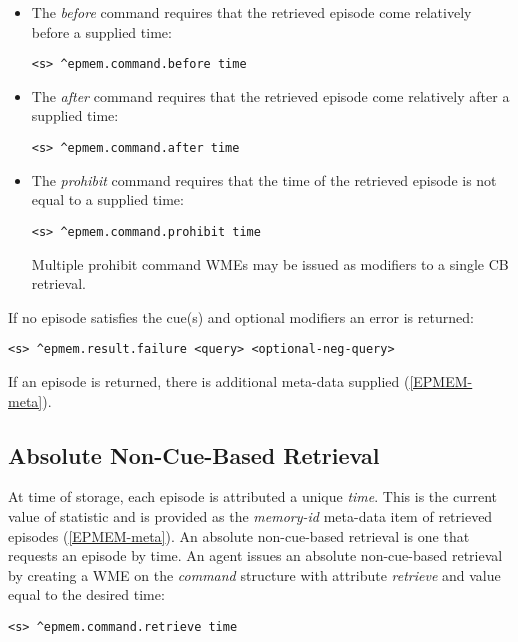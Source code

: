 \begin{itemize}

\item 
The \emph{before} command requires that the retrieved episode come relatively before a supplied time:
\begin{verbatim}
<s> ^epmem.command.before time
\end{verbatim}

\item 
The \emph{after} command requires that the retrieved episode come relatively after a supplied time:
\begin{verbatim}
<s> ^epmem.command.after time
\end{verbatim}

\item 
The \emph{prohibit} command requires that the time of the retrieved episode is not equal to a supplied time:
\begin{verbatim}
<s> ^epmem.command.prohibit time
\end{verbatim}
Multiple prohibit command WMEs may be issued as modifiers to a single CB retrieval.

\end{itemize}

If no episode satisfies the cue(s) and optional modifiers an error is returned:

\begin{verbatim}
<s> ^epmem.result.failure <query> <optional-neg-query>
\end{verbatim}

If an episode is returned, there is additional meta-data supplied (\ref{EPMEM-meta}).

\subsection{Absolute Non-Cue-Based Retrieval}
At time of storage, each episode is attributed a unique \emph{time}.  
This is the current value of  statistic and is provided as the \emph{memory-id} meta-data item of retrieved episodes (\ref{EPMEM-meta}).  
An absolute non-cue-based retrieval is one that requests an episode by time.  
An agent issues an absolute non-cue-based retrieval by creating a WME on the \emph{command} structure with attribute \emph{retrieve} and value equal to the desired time:

\begin{verbatim}
<s> ^epmem.command.retrieve time
\end{verbatim}

